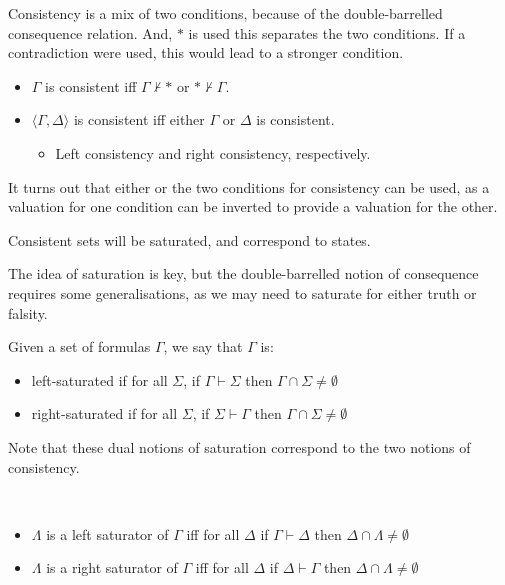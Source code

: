 \documentclass[10pt]{article}
\begin{document}
\begin{definition}[Consistency]
  Consistency is a mix of two conditions, because of the double-barrelled consequence relation.
  And, \(\ast\) is used this separates the two conditions.
  If a contradiction were used, this would lead to a stronger condition.
  \begin{itemize}
  \item \(\Gamma\) is consistent iff \(\Gamma \nvdash \ast\) or \(\ast \nvdash \Gamma\).
  \item \(\langle \Gamma,\Delta \rangle\) is consistent iff either \(\Gamma\) or \(\Delta\) is consistent.
    \begin{itemize}
    \item Left consistency and right consistency, respectively.
    \end{itemize}
  \end{itemize}
  It turns out that either or the two conditions for consistency can be used, as a valuation for one condition can be inverted to provide a valuation for the other.
\end{definition}

Consistent sets will be saturated, and correspond to states.

The idea of saturation is key, but the double-barrelled notion of consequence requires some generalisations, as we may need to saturate for either truth or falsity.

\begin{definition}[Saturation]
  Given a set of formulas \(\Gamma\), we say that \(\Gamma\) is:
  \begin{itemize}
  \item left-saturated if for all \(\Sigma\), if \(\Gamma \vdash \Sigma\) then \(\Gamma \cap \Sigma \ne \emptyset\)
  \item right-saturated if for all \(\Sigma\), if \(\Sigma \vdash \Gamma\) then \(\Gamma \cap \Sigma \ne \emptyset\)
  \end{itemize}
\end{definition}

Note that these dual notions of saturation correspond to the two notions of consistency.

\begin{definition}[Saturators]
  \mbox{ }
  \begin{itemize}
  \item \(\Lambda\) is a left saturator of \(\Gamma\) iff for all \(\Delta\) if \(\Gamma \vdash \Delta\) then \(\Delta \cap \Lambda \ne \emptyset\)
  \item \(\Lambda\) is a right saturator of \(\Gamma\) iff for all \(\Delta\) if \(\Delta \vdash \Gamma\) then \(\Delta \cap \Lambda \ne \emptyset\)
  \end{itemize}
\end{definition}
\end{document}
